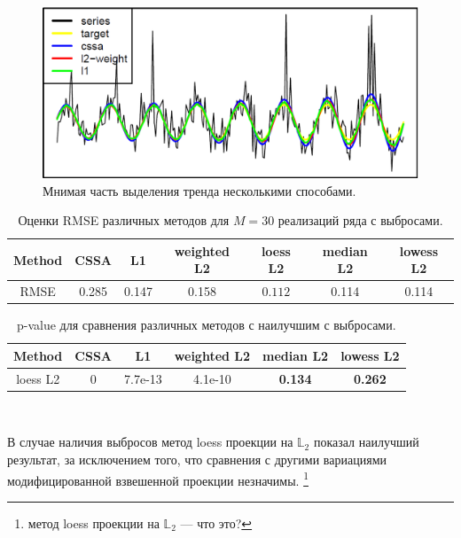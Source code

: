 \documentclass[specialist,
               substylefile = spbu.rtx,
               subf,href,colorlinks=true, 12pt]{disser}
\begin{document}
\begin{figure}[H]
	\begin{center}
		\includegraphics[width=0.67\linewidth]{img/analys_1_Im.png}
	\end{center}
	\caption{Мнимая часть выделения тренда несколькими способами.}
	\label{analys_Im_1}
\end{figure}

\begin{table}[H]
	\begin{center}
		\caption{Оценки RMSE различных методов для $M = 30$ реализаций ряда с выбросами.}
		\label{tab2}
		\begin{tabular}{|c|c|c|c|c|c|c|}
			\hline
			Method 	& CSSA & L1 & weighted L2 & loess L2 & median L2 & lowess L2 \\
			\hline
			RMSE & 0.285  & 0.147  & 0.158 & $\mathbf{0.112}$ & 0.114 & 0.114\\
			\hline
		\end{tabular}
	\end{center}
\end{table}

\begin{table}[H]
	\caption{p-value для сравнения различных методов с наилучшим с выбросами.}
	\label{tab: pval2}
	\begin{center}
		\begin{tabular}{|c|c|c|c|c|c|}
			\hline
			Method & CSSA	& L1 & weighted L2 & median L2 & lowess L2  \\
			\hline
			loess L2 & 0  & 7.7e-13 &   4.1e-10  &  \textbf{0.134} & \textbf{0.262}  \\
			\hline
		\end{tabular} \\
	\end{center}
\end{table}

В случае наличия выбросов метод loess проекции на $\mathbb{L}_2$ показал наилучший результат, за исключением того, что сравнения с другими вариациями модифицированной взвешенной проекции незначимы.
\footnote{метод loess проекции на $\mathbb{L}_2$ --- что это?}
\end{document}
